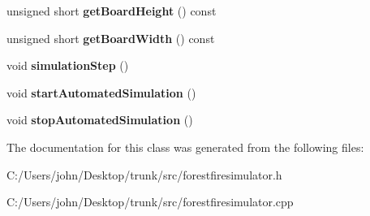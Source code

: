 \begin{DoxyCompactItemize}
\item 
unsigned short {\bfseries get\+Board\+Height} () const \hypertarget{class_forest_fire_simulator_a4b37c0227d160eca340db39764727ef5}{}\label{class_forest_fire_simulator_a4b37c0227d160eca340db39764727ef5}

\item 
unsigned short {\bfseries get\+Board\+Width} () const \hypertarget{class_forest_fire_simulator_aaccf1d08dcb19a5611aac26462d37139}{}\label{class_forest_fire_simulator_aaccf1d08dcb19a5611aac26462d37139}

\item 
void {\bfseries simulation\+Step} ()\hypertarget{class_forest_fire_simulator_ad42e3ebcd8d970c1798d089b1da1f803}{}\label{class_forest_fire_simulator_ad42e3ebcd8d970c1798d089b1da1f803}

\item 
void {\bfseries start\+Automated\+Simulation} ()\hypertarget{class_forest_fire_simulator_abfdcdcab2a2092f7af749abff6883c59}{}\label{class_forest_fire_simulator_abfdcdcab2a2092f7af749abff6883c59}

\item 
void {\bfseries stop\+Automated\+Simulation} ()\hypertarget{class_forest_fire_simulator_a296707f2f0ac431534ddbc4c2f790f3f}{}\label{class_forest_fire_simulator_a296707f2f0ac431534ddbc4c2f790f3f}

\end{DoxyCompactItemize}


The documentation for this class was generated from the following files\+:\begin{DoxyCompactItemize}
\item 
C\+:/\+Users/john/\+Desktop/trunk/src/forestfiresimulator.\+h\item 
C\+:/\+Users/john/\+Desktop/trunk/src/forestfiresimulator.\+cpp\end{DoxyCompactItemize}
